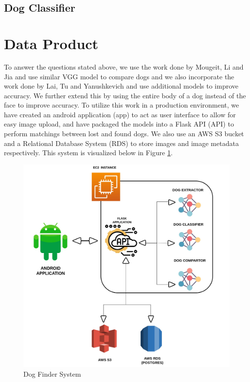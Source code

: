 \documentclass{article}
\begin{document}
\subsection{Dog Classifier}

\newpage

\section{Data Product}

To answer the questions stated above, we use the work done by Mougeit, Li and Jia and use similar VGG model to compare dogs and we also incorporate the work done by Lai, Tu and Yanushkevich and use additional models to improve accuracy.  We further extend this by using the entire body of a dog instead of the face to improve accuracy.  To utilize this work in a production environment, we have created an android application (app) to act as user interface to allow for easy image upload, and have packaged the models into a Flask API (API) to perform matchings between lost and found dogs. We also use an AWS S3 bucket and a Relational Database System (RDS) to store images and image metadata respectively.  This system is visualized below in Figure \ref{fig:x app system}.

\begin{figure}[h]
\centering
	\includegraphics[scale=0.1]{final-report-images/system.jpeg}
\caption{Dog Finder System}
\label{fig:x app system}
\end{figure}
\end{document}
